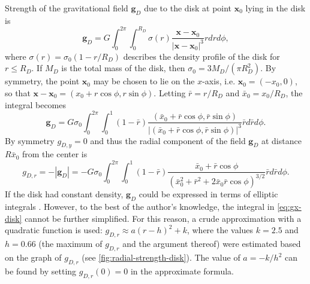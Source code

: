 Strength of the gravitational field $\mathbf{g}_D$ due to the disk at point $\mathbf{x}_0$ lying in the disk is
\begin{equation*}
    \mathbf{g}_D = G \int_{0}^{2\pi}\int_{0}^{R_D} \sigma(r) \frac{\mathbf{x} - \mathbf{x}_0}{|\mathbf{x} - \mathbf{x}_0|^3}r dr d\phi,
\end{equation*}
where $\sigma(r) = \sigma_0(1 - r/R_D)$ describes the density profile of the disk for $r \leq R_D$.
If $M_D$ is the total mass of the disk, then $\sigma_0 = 3M_D / (\pi R_D^2)$.
By symmetry, the point $\mathbf{x}_0$ may be chosen to lie on the $x$-axis, i.e. $\mathbf{x}_0 = (-x_0, 0)$, so that $\mathbf{x} - \mathbf{x}_0 = (x_0 + r\cos\phi, r\sin\phi)$.
Letting $\bar{r} = r/R_D$ and $\bar{x}_0 = x_0 / R_D$, the integral becomes
\begin{equation*}
    \mathbf{g}_D = G\sigma_0 \int_{0}^{2\pi} \int_{0}^{1} (1 - \bar{r}) \frac{(\bar{x}_0 + \bar{r}\cos\phi, \bar{r}\sin\phi)}{|(\bar{x}_0 + \bar{r}\cos\phi, \bar{r}\sin\phi)|^3}\bar{r} d\bar{r} d\phi.
\end{equation*}
By symmetry $g_{D,y} = 0$ and thus the radial component of the field $\mathbf{g}_D$ at distance $R\bar{x}_0$ from the center is
\begin{equation}\label{eq:gx-disk}
    g_{D,r} = -|\mathbf{g}_D| = -G\sigma_0 \int_{0}^{2\pi} \int_{0}^{1} (1 - \bar{r})\frac{\bar{x}_0 + \bar{r}\cos\phi}{(\bar{x}_0^2+\bar{r}^2+2\bar{x}_0\bar{r}\cos\phi)^{3/2}}\bar{r}d\bar{r}d\phi.
\end{equation}
If the disk had constant density, $\mathbf{g}_D$ could be expressed in terms of elliptic integrals \cite{Weiss2018}.
However, to the best of the author's knowledge, the integral in \autoref{eq:gx-disk} cannot be further simplified.
For this reason, a crude approximation with a quadratic function is used: $g_{D,r} \approx a(r - h)^2 + k$, where the values $k=2.5$ and $h=0.66$ (the maximum of $g_{D,r}$ and the argument thereof) were estimated based on the graph of $g_{D,r}$ (see \autoref{fig:radial-strength-disk}).
The value of $a = -k/h^2$ can be found by setting $g_{D,r}(0) = 0$ in the approximate formula.
